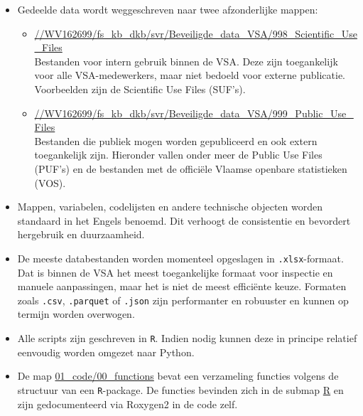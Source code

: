 \documentclass{VSAnote}
\begin{document}
\begin{itemize}
\begin{itemize}
\item \url{03_deriveddata}: bevat alle tussentijdse en afgeleide bestanden die uitsluitend intern worden gebruikt tijdens de verwerking.

\end{itemize}

\item Gedeelde data wordt weggeschreven naar twee afzonderlijke mappen:
\begin{itemize}[nosep]
\item \url{//WV162699/fs_kb_dkb/svr/Beveiligde_data_VSA/998_Scientific_Use_Files}\\
Bestanden voor intern gebruik binnen de VSA. Deze zijn toegankelijk voor alle VSA-medewerkers, maar niet bedoeld voor externe publicatie. Voorbeelden zijn de Scientific Use Files (SUF's).

\item \url{//WV162699/fs_kb_dkb/svr/Beveiligde_data_VSA/999_Public_Use_Files}\\
Bestanden die publiek mogen worden gepubliceerd en ook extern toegankelijk zijn. Hieronder vallen onder meer de Public Use Files (PUF's) en de bestanden met de officiële Vlaamse openbare statistieken (VOS).
\end{itemize}

\item Mappen, variabelen, codelijsten en andere technische objecten worden standaard in het Engels benoemd. Dit verhoogt de consistentie en bevordert hergebruik en duurzaamheid.

\item De meeste databestanden worden momenteel opgeslagen in \texttt{.xlsx}-formaat. Dat is binnen de VSA het meest toegankelijke formaat voor inspectie en manuele aanpassingen, maar het is niet de meest efficiënte keuze. Formaten zoals \texttt{.csv}, \texttt{.parquet} of \texttt{.json} zijn performanter en robuuster en kunnen op termijn worden overwogen.

\item Alle scripts zijn geschreven in \texttt{R}. Indien nodig kunnen deze in principe relatief eenvoudig worden omgezet naar Python.

\item De map \url{01_code/00_functions} bevat een verzameling functies volgens de structuur van een \texttt{R}-package. De functies bevinden zich in de submap \url{R} en zijn gedocumenteerd via Roxygen2 in de code zelf.

\end{itemize}
\end{document}
